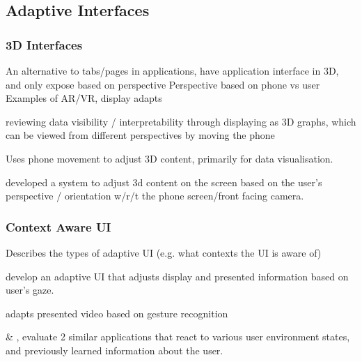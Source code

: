 \subsection{Adaptive Interfaces}

\subsubsection{3D Interfaces} %
An alternative to tabs/pages in applications, have application interface in 3D, and only expose based on perspective
Perspective based on phone vs user
Examples of AR/VR, display adapts

\cite{miyazaki2021ar} reviewing data visibility / interpretability through displaying as 3D graphs, which can be viewed from different perspectives by moving the phone

\cite{buschel2017investigating} Uses phone movement to adjust 3D content, primarily for data visualisation.

\cite{francone2011using} developed a system to adjust 3d content on the screen based on the user's perspective / orientation w/r/t the phone screen/front facing camera.



\subsubsection{Context Aware UI}

\cite{wesson2010can} Describes the types of adaptive UI (e.g. what contexts the UI is aware of) 

\cite{pfeuffer2021artention} develop an adaptive UI that adjusts display and presented information based on user's gaze.

\cite{clarke2020reactive} adapts presented video based on gesture recognition

\cite{yigitbas2019component} \& \cite{yigitbas2019context}, evaluate 2 similar applications that react to various user environment states, and previously learned information about the user.

